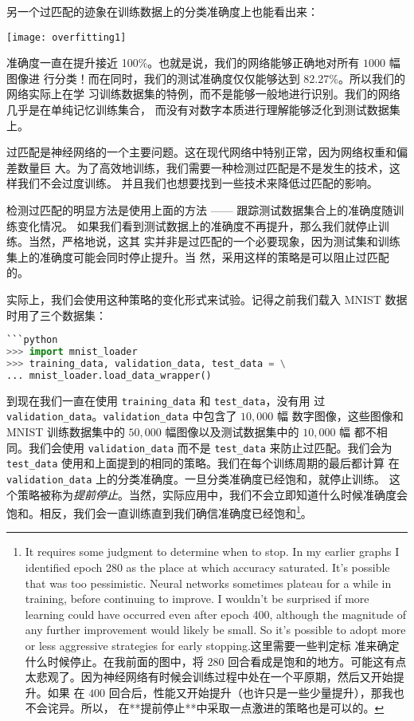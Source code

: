 另一个过匹配的迹象在训练数据上的分类准确度上也能看出来：
\begin{center}
  \texttt{[image: overfitting1]}  %
\end{center}

准确度一直在提升接近 100\%。也就是说，我们的网络能够正确地对所有 $1000$ 幅图像进
行分类！而在同时，我们的测试准确度仅仅能够达到 82.27\%。所以我们的网络实际上在学
习训练数据集的特例，而不是能够一般地进行识别。我们的网络几乎是在单纯记忆训练集合，
而没有对数字本质进行理解能够泛化到测试数据集上。

过匹配是神经网络的一个主要问题。这在现代网络中特别正常，因为网络权重和偏差数量巨
大。为了高效地训练，我们需要一种检测过匹配是不是发生的技术，这样我们不会过度训练。
并且我们也想要找到一些技术来降低过匹配的影响。

检测过匹配的明显方法是使用上面的方法 —— 跟踪测试数据集合上的准确度随训练变化情况。
如果我们看到测试数据上的准确度不再提升，那么我们就停止训练。当然，严格地说，这其
实并非是过匹配的一个必要现象，因为测试集和训练集上的准确度可能会同时停止提升。当
然，采用这样的策略是可以阻止过匹配的。

实际上，我们会使用这种策略的变化形式来试验。记得之前我们载入 MNIST 数据时用了三个数据集：

\begin{lstlisting}[language=Python]
```python
>>> import mnist_loader
>>> training_data, validation_data, test_data = \
... mnist_loader.load_data_wrapper()
\end{lstlisting}

到现在我们一直在使用 \lstinline!training_data! 和 \lstinline!test_data!，没有用
过 \lstinline!validation_data!。\lstinline!validation_data! 中包含了 $10,000$ 幅
数字图像，这些图像和 MNIST 训练数据集中的 $50,000$ 幅图像以及测试数据集中的 $10,000$ 幅
都不相同。我们会使用 \lstinline!validation_data! 而不是 \lstinline!test_data! 来防止过匹配。我们会为 \lstinline!test_data! 使用和上面提到的相同的策略。我们在每个训练周期的最后都计算
在 \lstinline!validation_data! 上的分类准确度。一旦分类准确度已经饱和，就停止训练。
这个策略被称为\emph{提前停止}。当然，实际应用中，我们不会立即知道什么时候准确度会
饱和。相反，我们会一直训练直到我们确信准确度已经饱和\footnote{It requires some judgment to determine when to stop. In my earlier graphs I identified epoch 280 as the place at which accuracy saturated. It's possible that was too pessimistic. Neural networks sometimes plateau for a while in training, before continuing to improve. I wouldn't be surprised if more learning could have occurred even after epoch 400, although the magnitude of any further improvement would likely be small. So it's possible to adopt more or less aggressive strategies for early stopping.这里需要一些判定标
  准来确定什么时候停止。在我前面的图中，将 $280$ 回合看成是饱和的地方。可能这有点
  太悲观了。因为神经网络有时候会训练过程中处在一个平原期，然后又开始提升。如果
  在 $400$ 回合后，性能又开始提升（也许只是一些少量提升），那我也不会诧异。所以，
  在**提前停止**中采取一点激进的策略也是可以的。}。

